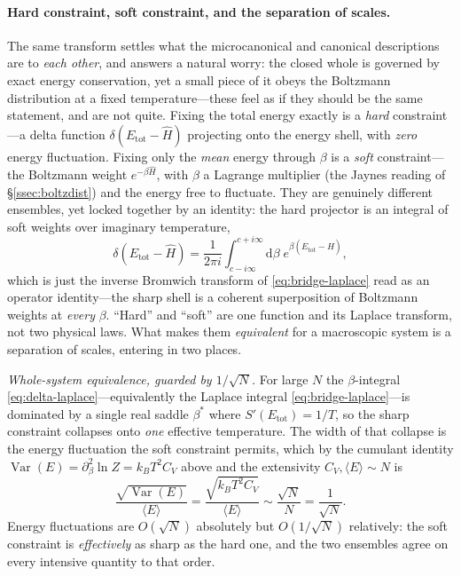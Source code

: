 \documentclass[11pt,a4paper]{article}
\theoremstyle{definition}
\newcommand{\dd}{\mathrm{d}}
\begin{document}
\paragraph{Hard constraint, soft constraint, and the separation of scales.} The
same transform settles what the microcanonical and canonical descriptions are to
\emph{each other}, and answers a natural worry: the closed whole is governed by
exact energy conservation, yet a small piece of it obeys the Boltzmann
distribution at a fixed temperature---these feel as if they should be the same
statement, and are not quite. Fixing the total energy exactly is a \emph{hard}
constraint---a delta function $\delta(E_{\mathrm{tot}}-\hat H)$ projecting onto
the energy shell, with \emph{zero} energy fluctuation. Fixing only the
\emph{mean} energy through $\beta$ is a \emph{soft} constraint---the Boltzmann
weight $e^{-\beta\hat H}$, with $\beta$ a Lagrange multiplier (the Jaynes reading
of \S\ref{ssec:boltzdist}) and the energy free to fluctuate. They are genuinely
different ensembles, yet locked together by an identity: the hard projector is an
integral of soft weights over imaginary temperature,
\begin{equation}\label{eq:delta-laplace}
\delta(E_{\mathrm{tot}}-\hat H)
=\frac{1}{2\pi i}\int_{c-i\infty}^{c+i\infty}\!\dd\beta\;
   e^{\beta(E_{\mathrm{tot}}-\hat H)},
\end{equation}
which is just the inverse Bromwich transform of \eqref{eq:bridge-laplace} read as
an operator identity---the sharp shell is a coherent superposition of Boltzmann
weights at \emph{every} $\beta$. ``Hard'' and ``soft'' are one function and its
Laplace transform, not two physical laws. What makes them \emph{equivalent} for a
macroscopic system is a separation of scales, entering in two places.

\emph{Whole-system equivalence, guarded by $1/\sqrt N$.} For large $N$ the
$\beta$-integral \eqref{eq:delta-laplace}---equivalently the Laplace integral
\eqref{eq:bridge-laplace}---is dominated by a single real saddle $\beta^\ast$
where $S'(E_{\mathrm{tot}})=1/T$, so the sharp constraint collapses onto
\emph{one} effective temperature. The width of that collapse is the energy
fluctuation the soft constraint permits, which by the cumulant identity
$\operatorname{Var}(E)=\partial_\beta^{2}\ln Z=k_BT^{2}C_V$ above and the
extensivity $C_V,\langle E\rangle\sim N$ is
\begin{equation}\label{eq:relfluct}
\frac{\sqrt{\operatorname{Var}(E)}}{\langle E\rangle}
=\frac{\sqrt{k_BT^{2}C_V}}{\langle E\rangle}\sim\frac{\sqrt N}{N}=\frac{1}{\sqrt N}.
\end{equation}
Energy fluctuations are $O(\sqrt N)$ absolutely but $O(1/\sqrt N)$ relatively: the
soft constraint is \emph{effectively} as sharp as the hard one, and the two
ensembles agree on every intensive quantity to that order.
\end{document}
